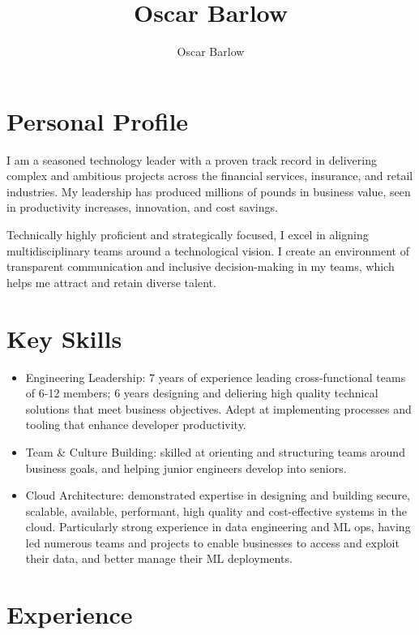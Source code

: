 \documentclass[a4paper]{scrartcl}
\author{Oscar Barlow}
\title{Oscar Barlow}
\date{}
\begin{document}
\maketitle


\section*{Personal Profile}
 { %
  \setlength{\parskip}{6pt plus 2pt minus 1pt}
  I am a seasoned technology leader with a proven track record in
  delivering complex and ambitious projects across the financial services,
  insurance,
  and retail industries. My leadership has produced
  millions of pounds in business value, seen in
  productivity increases, innovation, and cost savings.

  Technically highly proficient and strategically focused, I excel in aligning
  multidisciplinary
  teams around a technological vision. I create an environment of
  transparent communication and inclusive decision-making in my teams, which helps me attract and retain diverse talent.
 } %

\section*{Key Skills}
\begin{itemize}
	\item Engineering Leadership: 7 years of experience leading cross-functional teams of 6-12 members; 6 years designing and deliering high quality technical solutions that meet business objectives. Adept at implementing processes and tooling that enhance developer productivity.
	\item Team \& Culture Building: skilled at orienting and structuring teams around business goals, and helping junior engineers develop into seniors.
	\item Cloud Architecture: demonstrated expertise in designing and building secure,
	      scalable, available, performant, high quality and cost-effective
	      systems in the
	      cloud. Particularly strong experience in data engineering and ML ops, having led numerous teams and projects to enable businesses to access and exploit their data, and better manage their ML deployments.
\end{itemize}

\section*{Experience}
\end{document}
